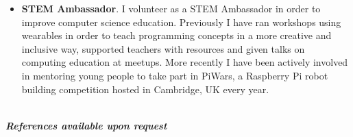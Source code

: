\documentclass{article}
\begin{document}
\begin{flushleft}
\begin{itemize}
\item \textbf{STEM Ambassador}. I volunteer as a STEM Ambassador in order to improve computer science education. Previously I have ran workshops using wearables in order to teach programming concepts in a more creative and inclusive way, supported teachers with resources and given talks on computing education at meetups. More recently I have been actively involved in mentoring young people to take part in PiWars, a Raspberry Pi robot building competition hosted in Cambridge, UK every year.
\end{itemize}
\end{flushleft}\\[15pt]

\textbf{\textit{References available upon request}}
\end{document}
